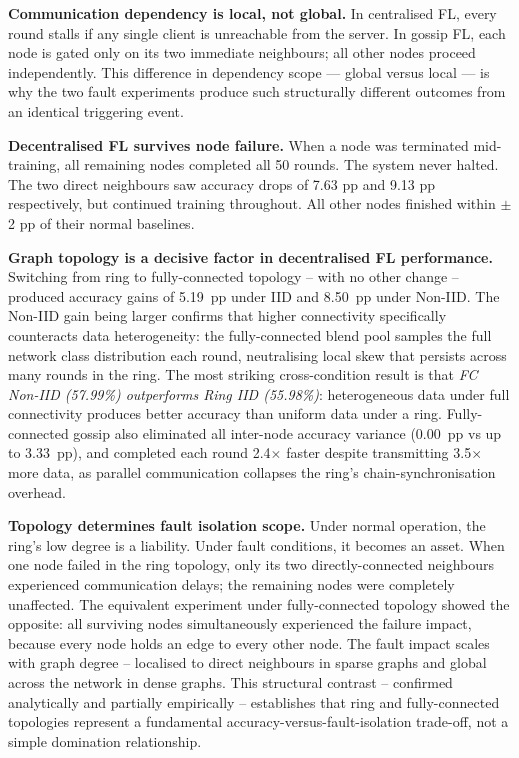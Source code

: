 \documentclass[12pt]{report}
\begin{document}
\textbf{Communication dependency is local, not global.}
In centralised FL, every round stalls if any single client is unreachable
from the server. In gossip FL, each node is gated only on its two immediate
neighbours; all other nodes proceed independently. This difference in
dependency scope --- global versus local --- is why the two fault experiments
produce such structurally different outcomes from an identical triggering
event.

\textbf{Decentralised FL survives node failure.}
When a node was terminated mid-training, all remaining nodes completed all 50
rounds. The system never halted. The two direct neighbours saw accuracy drops
of 7.63 pp and 9.13 pp respectively, but continued training throughout.
All other nodes finished within $\pm$2 pp of their normal baselines.

\textbf{Graph topology is a decisive factor in decentralised FL performance.}
Switching from ring to fully-connected topology -- with no other change --
produced accuracy gains of 5.19~pp under IID and 8.50~pp under Non-IID.
The Non-IID gain being larger confirms that higher connectivity specifically
counteracts data heterogeneity: the fully-connected blend pool samples the
full network class distribution each round, neutralising local skew that
persists across many rounds in the ring. The most striking cross-condition
result is that \emph{FC Non-IID (57.99\%) outperforms Ring IID (55.98\%)}:
heterogeneous data under full connectivity produces better accuracy than
uniform data under a ring. Fully-connected gossip also eliminated all
inter-node accuracy variance (0.00~pp vs up to 3.33~pp), and completed
each round 2.4$\times$ faster despite transmitting 3.5$\times$ more data,
as parallel communication collapses the ring's chain-synchronisation overhead.

\textbf{Topology determines fault isolation scope.}
Under normal operation, the ring's low degree is a liability. Under fault
conditions, it becomes an asset. When one node failed in the ring topology,
only its two directly-connected neighbours experienced communication delays;
the remaining nodes were completely unaffected. The equivalent experiment under fully-connected topology
showed the opposite: all surviving nodes simultaneously experienced the failure
impact, because every node holds an edge to every other node. The fault impact
scales with graph degree -- localised to direct neighbours in sparse graphs
and global across the network in dense graphs. This structural contrast --
confirmed analytically and partially empirically -- establishes that ring and
fully-connected topologies represent a fundamental accuracy-versus-fault-isolation
trade-off, not a simple domination relationship.
\end{document}

